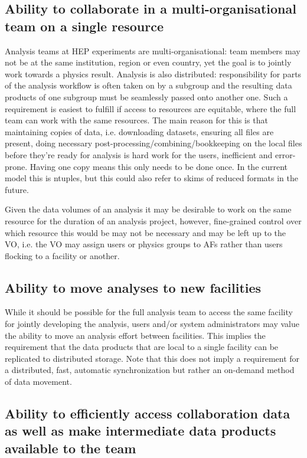 \subsection*{Ability to collaborate in a multi-organisational team on a single resource}

Analysis teams at HEP experiments are multi-organisational: team members may not be at the same institution, region or even country, yet the goal is to jointly work towards a physics result. Analysis is also distributed: responsibility for parts of the analysis workflow is often taken on by a subgroup and the resulting data products of one subgroup must be seamlessly passed onto another one. Such a requirement is easiest to fulfill if access to resources are equitable, where the full team can work with the same resources. The main reason for this is that maintaining copies of data, i.e. downloading datasets, ensuring all files are present, doing necessary post-processing/combining/bookkeeping on the local files before they're ready for analysis is hard work for the users, inefficient and error-prone. Having one copy means this only needs to be done once. In the current model this is ntuples, but this could also refer to skims of reduced formats in the future. 

Given the data volumes of an analysis it may be desirable to work on the same resource for the duration of an analysis project, however, fine-grained control over which resource this would be may not be necessary and may be left up to the VO, i.e. the VO may assign users or physics groups to AFs rather than users flocking to a facility or another. 

\subsection*{Ability to move analyses to new facilities}

While it should be possible for the full analysis team to access the same facility for jointly developing the analysis, users and/or system administrators may value the ability to move an analysis effort between facilities. This implies the requirement that the data products that are local to a single facility can be replicated to distributed storage. Note that this does not imply a requirement for a distributed, fast, automatic synchronization but rather an on-demand method of data movement. 

\subsection*{Ability to efficiently access collaboration data as well as make intermediate data products available to the team}

